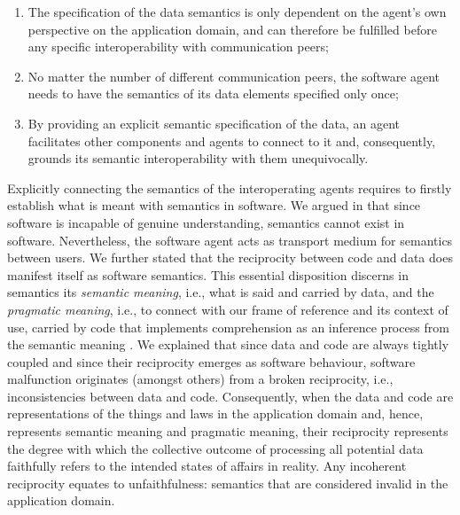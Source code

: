 \documentclass[sort&compress,preprint,authoryear,3p,twocolumn]{elsarticle}
\begin{document}
\begin{mmdp}
\begin{enumerate}
  \item The specification of the data semantics is only dependent on the agent’s own perspective on the application domain, and can therefore be fulfilled before any specific interoperability with communication peers;
  \item No matter the number of different communication peers, the software agent needs to have the semantics of its data elements specified only once;
  \item By providing an explicit semantic specification of the data, an agent facilitates other components and agents to connect to it and, consequently, grounds its semantic interoperability with them unequivocally.
\end{enumerate}  
\end{mmdp}

Explicitly connecting the semantics of the interoperating agents
requires to firstly establish what is meant with semantics in software.
We argued in \citep{Brandt2018a} that since software is incapable of
genuine understanding, semantics cannot exist in software. Nevertheless,
the software agent acts as transport medium for semantics between users.
We further stated that the reciprocity between code and data does
manifest itself as software semantics. This essential disposition
discerns in semantics its \emph{semantic meaning}, i.e., what is said
and carried by data, and the \emph{pragmatic meaning}, i.e., to connect
with our frame of reference and its context of use, carried by code that
implements comprehension as an inference process from the semantic
meaning \citep{Grice:1991BT}. We explained that since data and code are
always tightly coupled and since their reciprocity emerges as software
behaviour, software malfunction originates (amongst others) from a
broken reciprocity, i.e., inconsistencies between data and code.
Consequently, when the data and code are representations of the things
and laws in the application domain and, hence, represents semantic
meaning and pragmatic meaning, their reciprocity represents the degree
with which the collective outcome of processing all potential data
faithfully refers to the intended states of affairs in reality. Any
incoherent reciprocity equates to unfaithfulness: semantics that are
considered invalid in the application domain.
\end{document}
